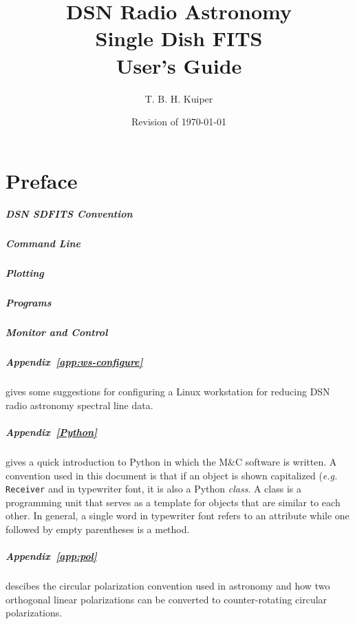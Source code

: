 \documentclass[letterpaper,11pt]{book}
\title{DSN Radio Astronomy\\
  Single Dish FITS\\ 
  User's Guide}
\author{T. B. H. Kuiper}
\date{Revision of \today}
\begin{document}
\maketitle
\frontmatter
\chapter*{Preface}

\paragraph{DSN SDFITS Convention}

\paragraph{Command Line}

\paragraph{Plotting}

\paragraph{Programs}

\paragraph{Monitor and Control}

\paragraph{Appendix~\ref{app:ws-configure}} gives some suggestions for
configuring a Linux workstation for reducing DSN radio astronomy spectral line 
data.

\paragraph{Appendix~\ref{Python}} gives a quick introduction to Python in 
which the M\&C software is written. A convention used in this document is that 
if an object 
is shown capitalized ({\it e.g.} {\tt Receiver} and in typewriter font, it is
also a Python {\it class}. A class is a programming unit that serves as a 
template for objects that are similar to each other.  In general,
a single word in typewriter font refers to an attribute while one followed by
empty parentheses is a method.

\paragraph{Appendix~\ref{app:pol}} descibes the circular polarization 
convention used in astronomy and how two orthogonal linear polarizations can
be converted to counter-rotating circular polarizations.
\end{document}
